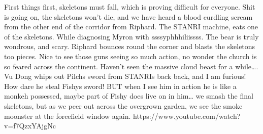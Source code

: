 First things first, skeletons must fall, which is proving difficult for everyone. Shit is going on, the skeletons won’t die, and we have heard a blood curdling scream from the other end of the corridor from Riphard.\medskip
The STANRI machine, eats one of the skeletons. While diagnosing Myron with ssssyphhhiliissss. The bear is truly wondrous, and scary. Riphard bounces round the corner and blasts the skeletons too pieces. Nice to see those guns seeing so much action, no wonder the church is so feared across the continent. Haven’t seen the massive cloud beast for a while….\medskip
Vu Dong whips out Pilchs sword from STANRIs back back, and I am furious! How dare he steal Fishys sword! BUT when I see him in action he is like a monkeh possessed, maybe part of Fishy does live on in him… we smash the final skeletons, but as we peer out across the overgrown garden, we see the smoke moonster at the forcefield window again.\medskip
https://www.youtube.com/watch?v=f7QzxYAjgNc\medskip
